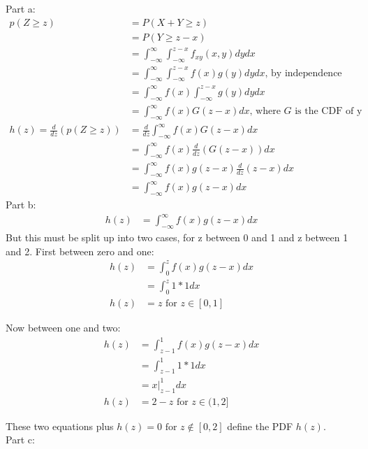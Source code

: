\documentclass{article}
\newcommand{\1}{\mathbf{1}}
\begin{document}
Part a:
\begin{align}
    p(Z \ge z) & = P(X+Y \ge z) \\
    & = P(Y \ge z-x) \\
    & = \int_{-\infty}^{\infty} \int_{-\infty}^{z-x} f_{xy}(x,y) dy dx  \\
    & = \int_{-\infty}^{\infty} \int_{-\infty}^{z-x} f(x)g(y) dy dx  \text{, by independence}\\
    & = \int_{-\infty}^{\infty}  f(x) \int_{-\infty}^{z-x}g(y) dy dx \\
    & = \int_{-\infty}^{\infty}  f(x) G(z-x) dx \text{, where $G$ is the CDF of y}\\
    h(z) = \frac{d}{dz}(p(Z \ge z) ) & = \frac{d}{dz}  \int_{-\infty}^{\infty}  f(x) G(z-x) dx \\
    & =   \int_{-\infty}^{\infty}  f(x) \frac{d}{dz}(  G(z-x) ) dx \\
    & =   \int_{-\infty}^{\infty}  f(x) g(z-x) \frac{d}{dz}(z-x) dx \\
    & =   \int_{-\infty}^{\infty}  f(x) g(z-x) dx 
\end{align}
Part b:
\begin{align}
     h(z) & = \int_{-\infty}^{\infty}  f(x) g(z-x) dx 
\end{align}
But this must be split up into two cases, for z between 0 and 1 and z between 1 and 2. 
First between zero and one:
\begin{align}
     h(z) & = \int_{0}^{z}  f(x) g(z-x) dx \\
     & = \int_{0}^{z}  1*1 dx \\
     h(z) & = z \text{ for } z \in [0,1]
\end{align}

Now between one and two:
\begin{align}
     h(z) & = \int_{z-1}^{1}  f(x) g(z-x) dx \\
     & = \int_{z-1}^{1}  1*1 dx \\
     & =  x |_{z-1}^1 dx \\
     h(z) & = 2-z \text{ for } z \in (1,2]
\end{align}

These two equations plus $h(z)=0\text{ for } z \notin [0,2]$ define the PDF $h(z)$.\\


Part c:\\
\end{document}
